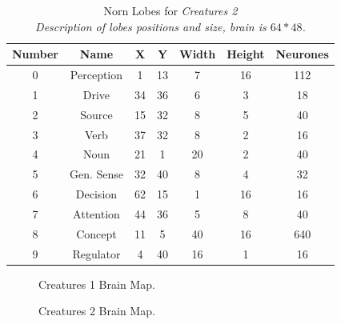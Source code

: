 \documentclass[11pt,twoside,a4paper]{article}
\begin{document}
	\begin{table}[ht]
		\begin{center} \begin{scriptsize}
		\begin{tabular}{|c|c|c|c|c|c|c|}
			\hline
		\rowcolor[gray]{0.75} 
		Number	&	Name	&	X	&	Y	&	Width	&	Height	&	Neurones \\ \hline
		0	&	Perception	&	1	&	13	&	7		&	16		&	112 \\ \hline
		1	&	Drive		&	34	&	36	&	6		&	3		&	18 \\ \hline
		2	&	Source		&	15	&	32	&	8		&	5		&	40 \\ \hline
		3	&	Verb		&	37	&	32	&	8		&	2		&	16 \\ \hline
		4	&	Noun		&	21	&	1	&	20		&	2		&	40 \\ \hline
		5	&	Gen. Sense	&	32	&	40	&	8		&	4		&	32 \\ \hline
		6	&	Decision	&	62	&	15	&	1		&	16		&	16 \\ \hline
		7	&	Attention	&	44	&	36	&	5		&	8		&	40 \\ \hline
		8	&	Concept		&	11	&	5	&	40		&	16		&	640 \\ \hline
		9	&	Regulator	&	4	&	40	&	16		&	1		&	16 \\ \hline
		\end{tabular}
		\end{scriptsize} \end{center}
		\caption[Norn Lobes for \emph{Creatures 2}]{Norn Lobes for \emph{Creatures 2} \\ \emph{Description of lobes positions and size,  brain is $64*48$. } } %
		\label{tab:nornsLobesPositionsCreatures2}
	\end{table}

\begin{minipage}{0.5\textwidth}
\begin{figure}[H]
	\centerline {}
	\caption{Creatures 1 Brain Map. } %
	\label{fig:Creatures1BrainMap}
\end{figure}
\end{minipage}
\begin{minipage}{0.1\textwidth}\end{minipage}
\begin{minipage}{0.5\textwidth}
\begin{figure}[H]
	\centerline {}
	\caption{Creatures 2 Brain Map. } %
	\label{fig:Creatures2BrainMap}
\end{figure}
\end{minipage}
\end{document}

